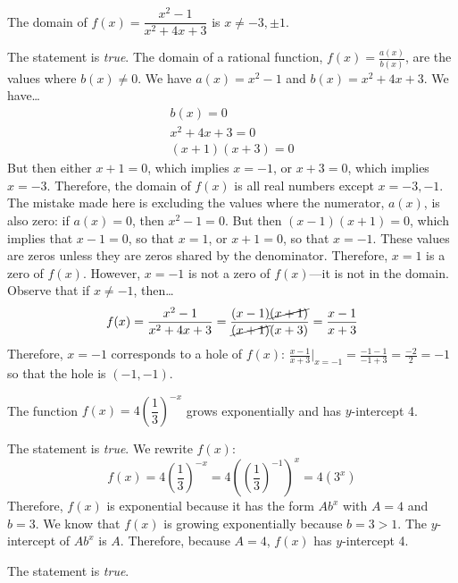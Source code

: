 \documentclass[11pt,letterpaper]{article}
\begin{document}
 The domain of $f(x)= \dfrac{x^2 - 1}{x^2 + 4x + 3}$ is $x \neq -3, \pm 1$. \pspace

\sol The statement is \textit{true}. The domain of a rational function, $f(x)= \frac{a(x)}{b(x)}$, are the values where $b(x) \neq 0$. We have $a(x)= x^2 - 1$ and $b(x)= x^2 + 4x + 3$. We have\dots
	\[
	\begin{gathered}
	b(x)= 0 \\
	x^2 + 4x + 3= 0 \\
	(x + 1)(x + 3)= 0 
	\end{gathered}
	\]
But then either $x + 1= 0$, which implies $x= -1$, or $x + 3=0 $, which implies $x= -3$. Therefore, the domain of $f(x)$ is all real numbers except $x= -3, -1$. The mistake made here is excluding the values where the numerator, $a(x)$, is also zero: if $a(x)= 0$, then $x^2 - 1= 0$. But then $(x - 1)(x + 1)= 0$, which implies that $x - 1= 0$, so that $x= 1$, or $x + 1= 0$, so that $x= -1$. These values are zeros unless they are zeros shared by the denominator. Therefore, $x= 1$ is a zero of $f(x)$. However, $x= -1$ is not a zero of $f(x)$---it is not in the domain. Observe that if $x \neq -1$, then\dots
	\[
	f(x)= \dfrac{x^2 - 1}{x^2 + 4x + 3}= \dfrac{(x - 1) \cancel{(x + 1)}}{\cancel{(x + 1)} (x + 3)}= \dfrac{x - 1}{x + 3}
	\]
Therefore, $x= -1$ corresponds to a hole of $f(x)$: $\frac{x - 1}{x + 3} \big|_{x= -1}= \frac{-1 - 1}{-1 + 3}= \frac{-2}{2}= -1$ so that the hole is $(-1, -1)$. 



\newpage



 The function $f(x)= 4 \left( \dfrac{1}{3} \right)^{-x}$ grows exponentially and has $y$-intercept 4. \pspace

\sol The statement is \textit{true}. We rewrite $f(x)$:
	\[
	f(x)= 4 \left( \dfrac{1}{3} \right)^{-x}= 4 \left( \left( \dfrac{1}{3} \right)^{-1} \right)^x= 4(3^x)
	\]
Therefore, $f(x)$ is exponential because it has the form $Ab^x$ with $A= 4$ and $b= 3$. We know that $f(x)$ is growing exponentially because $b= 3 > 1$. The $y$-intercept of $Ab^x$ is $A$. Therefore, because $A= 4$, $f(x)$ has $y$-intercept 4. \pvspace{1.3cm}



\pspace

\sol The statement is \textit{true}.
\end{document}
